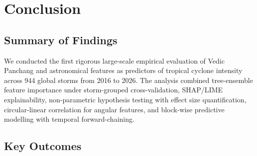 \documentclass[12pt,a4paper]{article}
\begin{document}
    \section{Conclusion}
    \label{sec:conclusion}

    \subsection{Summary of Findings}

    We conducted the first rigorous large-scale empirical evaluation of Vedic
    Panchang and astronomical features as predictors of tropical cyclone intensity
    across 944 global storms from 2016 to 2026. The analysis combined tree-ensemble
    feature importance under storm-grouped cross-validation, SHAP/LIME
    explainability, non-parametric hypothesis testing with effect size
    quantification, circular-linear correlation for angular features, and
    block-wise predictive modelling with temporal forward-chaining.

    \subsection{Key Outcomes}
\end{document}
